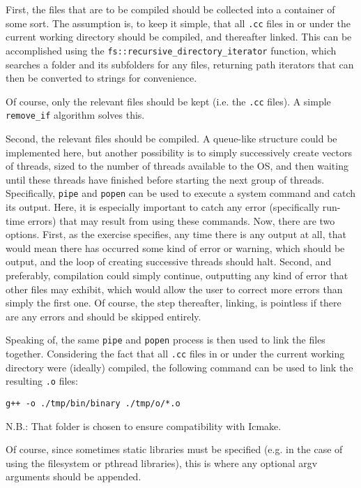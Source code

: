 First, the files that are to be compiled should be collected into a container of some sort. The assumption is, to keep it simple, that all \texttt{.cc} files in or under the current working directory should be compiled, and thereafter linked. This can be accomplished using the \texttt{fs::recursive\_directory\_iterator} function, which searches a folder and its subfolders for any files, returning path iterators that can then be converted to strings for convenience.

Of course, only the relevant files should be kept (i.e. the \texttt{.cc} files). A simple \texttt{remove\_if} algorithm solves this.

Second, the relevant files should be compiled. A queue-like structure could be implemented here, but another possibility is to simply successively create vectors of threads, sized to the number of threads available to the OS, and then waiting until these threads have finished before starting the next group of threads. Specifically, \texttt{pipe} and \texttt{popen} can be used to execute a system command and catch its output. Here, it is especially important to catch any error (specifically run-time errors) that may result from using these commands. Now, there are two options. First, as the exercise specifies, any time there is any output at all, that would mean there has occurred some kind of error or warning, which should be output, and the loop of creating successive threads should halt. Second, and preferably, compilation could simply continue, outputting any kind of error that other files may exhibit, which would allow the user to correct more errors than simply the first one. Of course, the step thereafter, linking, is pointless if there are any errors and should be skipped entirely.

Speaking of, the same \texttt{pipe} and \texttt{popen} process is then used to link the files together. Considering the fact that all \texttt{.cc} files in or under the current working directory were (ideally) compiled, the following command can be used to link the resulting \texttt{.o} files:

\texttt{g++ -o ./tmp/bin/binary ./tmp/o/*.o}

N.B.: That folder is chosen to ensure compatibility with Icmake.

Of course, since sometimes static libraries must be specified (e.g. in the case of using the filesystem or pthread libraries), this is where any optional argv arguments should be appended.
